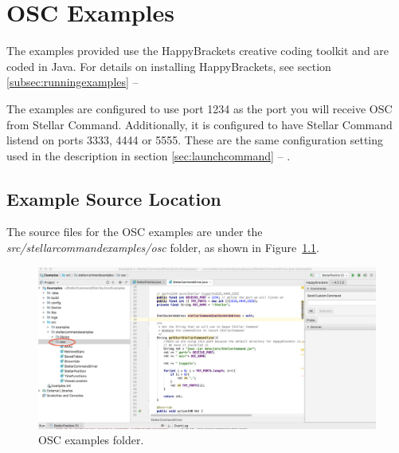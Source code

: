 \chapter{OSC Examples}\label{chap:oscexamples}
The examples provided use the HappyBrackets creative coding toolkit and are coded in Java. For details on installing HappyBrackets, see section \ref{subsec:runningexamples} --
\emph{}

The examples are configured to use port 1234 as the port you will receive OSC from Stellar Command. Additionally, it is configured to have Stellar Command listend on ports 3333, 4444 or 5555. These are the same configuration setting used in the description in section \ref{sec:launchcommand} --
\emph{}.

\section{Example Source Location}

The source files for the OSC examples are under the \textit{src/stellarcommandexamples/osc} folder, as shown in 
Figure~\ref{fig:oscexamplefolder}.

\begin{figure}[htbp]
	\centering
	\includegraphics[width=1\columnwidth]{oscexamplefolder}
	\caption{OSC examples folder.}
	\label{fig:oscexamplefolder}
\end{figure}
\bigskip


